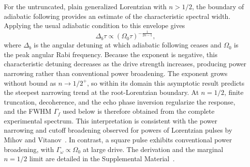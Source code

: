 For the untruncated, plain generalized Lorentzian with $n>1/2$, the boundary of
adiabatic following provides an estimate of the characteristic spectral width.
Applying the usual adiabatic condition to this envelope gives~\cite{boradjiev_power_2013}
\begin{equation}
\Delta_b\tau
\propto
(\Omega_0 \tau)^{-\frac{1}{2n-1}},
\label{eq:lorentzian_adiabatic}
\end{equation}
where $\Delta_b$ is the angular detuning at which adiabatic following ceases
and $\Omega_0$ is the peak angular Rabi frequency.  Because the exponent is
negative, this characteristic detuning decreases as the drive strength
increases, producing power narrowing rather than conventional power broadening.
The exponent grows without bound as $n\to1/2^+$, so within its domain this
asymptotic result predicts the steepest narrowing trend at the root-Lorentzian
boundary.  At $n=1/2$, finite truncation, decoherence, and the echo phase
inversion regularize the response, and the FWHM $\Gamma_f$ used below is
therefore obtained from the complete experimental spectrum.  This
interpretation is consistent
with the power narrowing and cutoff broadening observed for powers of
Lorentzian pulses by Mihov and Vitanov~\cite{mihov_defying_2024}.  In contrast,
a square pulse exhibits conventional power broadening, with
$\Gamma_\omega\propto\Omega_0$ at large drive.  The derivation and the marginal
$n=1/2$ limit are detailed in the Supplemental Material~\cite{SupplementalMaterial}.



